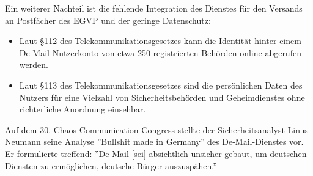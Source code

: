 Ein weiterer Nachteil ist die fehlende Integration des Dienstes für den Versands an Postfächer des EGVP und der geringe Datenschutz\textcite{bea:demail}:
\begin{itemize}
	\item Laut §112 des Telekommunikationsgesetzes kann die Identität hinter einem De-Mail-Nutzerkonto von etwa 250 registrierten Behörden online abgerufen werden.
	\item Laut §113 des Telekommunikationsgesetzes sind die persönlichen Daten des Nutzers für eine Vielzahl von Sicherheitsbehörden und Geheimdienstes ohne richterliche Anordnung einsehbar.
\end{itemize}

Auf dem 30. Chaos Communication Congress stellte der Sicherheitsanalyst Linus Neumann seine Analyse ''Bullshit made in Germany'' des De-Mail-Dienstes vor. Er formulierte treffend: ''De-Mail [sei] absichtlich unsicher gebaut, um deutschen Diensten zu ermöglichen, deutsche Bürger auszuspähen.''\textcite{bea:demail:bullshit}
 